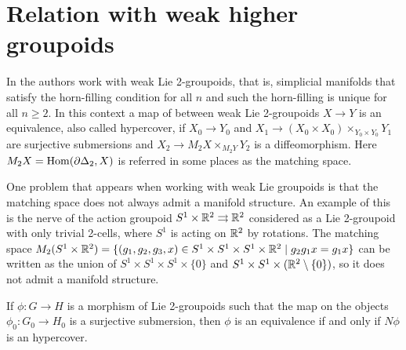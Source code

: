 %
%

\section{Relation with weak higher groupoids}

In \cite{zhu09} the authors work with weak Lie 2-groupoids, that is, simplicial manifolds that satisfy the horn-filling condition for all $n$ and such the horn-filling is unique for all $n\geq 2$.
In this context a map of between weak Lie 2-groupoids $X\to Y$ is an equivalence, also called hypercover, if $X_0\to Y_0$ and $X_1\to (X_0\times X_0)\times_{Y_0\times Y_0} Y_1$ are surjective submersions and $X_2\to M_2X\times_{M_2Y} Y_2$ is a diffeomorphism.
Here $M_2X = \operatorname{Hom}(\partial\Delta_2, X)$ is referred in some places as the matching space.

One problem that appears when working with weak Lie groupoids is that the matching space does not always admit a manifold structure.
An example of this is the nerve of the action groupoid $S^1\times\mathbb R^2 \rightrightarrows \mathbb R^2$ considered as a Lie 2-groupoid with only trivial 2-cells, where $S^1$ is acting on $\mathbb R^2$ by rotations.
The matching space
$ M_2(S^1\times\mathbb R^2) = \{ (g_1,g_2,g_3,x)\in S^1\times S^1\times S^1\times\mathbb R^2 \mid g_2g_1 x = g_1 x \} $
can be written as the union of $S^1\times S^1\times S^1\times \{0\}$ and $S^1\times S^1\times (\mathbb R^2\setminus \{0\})$, so it does not admit a manifold structure.

\begin{prop}
If $\phi\colon G\to H$ is a morphism of Lie 2-groupoids such that the map on the objects $\phi_0\colon G_0\to H_0$ is a surjective submersion, then $\phi$ is an equivalence if and only if $N\phi$ is an hypercover.
\end{prop}


